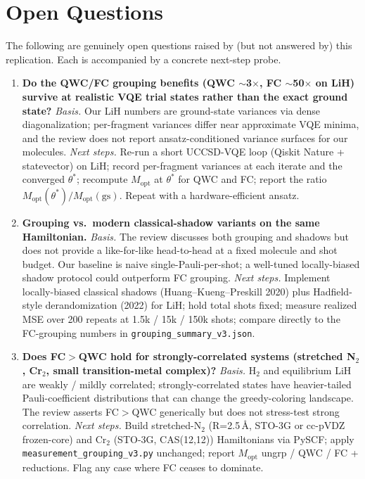 \section{Open Questions}

The following are genuinely open questions raised by (but not answered by)
this replication. Each is accompanied by a concrete next-step probe.

\begin{enumerate}
\item \textbf{Do the QWC/FC grouping benefits (QWC $\sim$3$\times$,
  FC $\sim$50$\times$ on LiH) survive at realistic VQE trial states rather
  than the exact ground state?}
  \emph{Basis.} Our LiH numbers are ground-state variances via dense
  diagonalization; per-fragment variances differ near approximate VQE minima,
  and the review does not report ansatz-conditioned variance surfaces for
  our molecules.
  \emph{Next steps.} Re-run a short UCCSD-VQE loop (Qiskit Nature +
  statevector) on LiH; record per-fragment variances at each iterate and
  the converged $\theta^*$; recompute $M_{\mathrm{opt}}$ at $\theta^*$ for
  QWC and FC; report the ratio $M_{\mathrm{opt}}(\theta^*)/M_{\mathrm{opt}}(\text{gs})$.
  Repeat with a hardware-efficient ansatz.

\item \textbf{Grouping vs.\ modern classical-shadow variants on the same
  Hamiltonian.}
  \emph{Basis.} The review discusses both grouping and shadows but does not
  provide a like-for-like head-to-head at a fixed molecule and shot budget.
  Our baseline is naive single-Pauli-per-shot; a well-tuned locally-biased
  shadow protocol could outperform FC grouping.
  \emph{Next steps.} Implement locally-biased classical shadows
  (Huang--Kueng--Preskill 2020) plus Hadfield-style derandomization (2022)
  for LiH; hold total shots fixed; measure realized MSE over 200 repeats at
  1.5k / 15k / 150k shots; compare directly to the FC-grouping numbers in
  \texttt{grouping\_summary\_v3.json}.

\item \textbf{Does FC$>$QWC hold for strongly-correlated systems (stretched
  N$_2$, Cr$_2$, small transition-metal complex)?}
  \emph{Basis.} H$_2$ and equilibrium LiH are weakly / mildly correlated;
  strongly-correlated states have heavier-tailed Pauli-coefficient
  distributions that can change the greedy-coloring landscape. The review
  asserts FC$>$QWC generically but does not stress-test strong correlation.
  \emph{Next steps.} Build stretched-N$_2$ (R=2.5\,\AA{}, STO-3G or
  cc-pVDZ frozen-core) and Cr$_2$ (STO-3G, CAS(12,12)) Hamiltonians via
  PySCF; apply \texttt{measurement\_grouping\_v3.py} unchanged; report
  $M_{\mathrm{opt}}$ ungrp / QWC / FC + reductions. Flag any case where
  FC ceases to dominate.


\end{enumerate}
